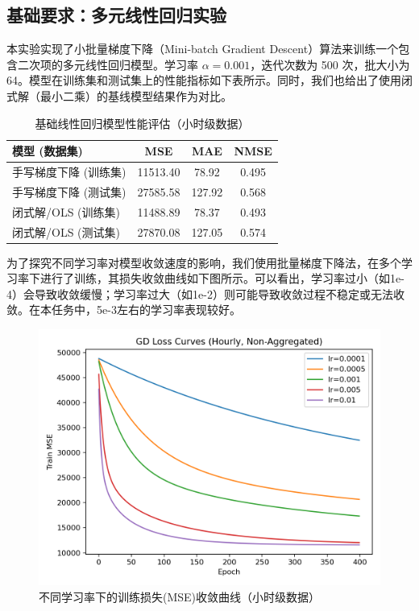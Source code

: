 \documentclass[UTF8,a4paper,10pt]{ctexart}
\begin{document}
\subsection{基础要求：多元线性回归实验}
本实验实现了小批量梯度下降（Mini-batch Gradient Descent）算法来训练一个包含二次项的多元线性回归模型。学习率 $\alpha=0.001$，迭代次数为 500 次，批大小为 64。模型在训练集和测试集上的性能指标如下表所示。同时，我们也给出了使用闭式解（最小二乘）的基线模型结果作为对比。

\begin{table}[H]
    \centering
    \caption{基础线性回归模型性能评估（小时级数据）}
    \begin{tabular}{lccc}
        \toprule
        \textbf{模型 (数据集)} & \textbf{MSE} & \textbf{MAE} & \textbf{NMSE} \\
        \midrule
        手写梯度下降 (训练集) & 11513.40 & 78.92 & 0.495 \\
        手写梯度下降 (测试集) & 27585.58 & 127.92 & 0.568 \\
        \midrule
        闭式解/OLS (训练集) & 11488.89 & 78.37 & 0.493 \\
        闭式解/OLS (测试集) & 27870.08 & 127.05 & 0.574 \\
        \bottomrule
    \end{tabular}
\end{table}

为了探究不同学习率对模型收敛速度的影响，我们使用批量梯度下降法，在多个学习率下进行了训练，其损失收敛曲线如下图所示。可以看出，学习率过小（如1e-4）会导致收敛缓慢；学习率过大（如1e-2）则可能导致收敛过程不稳定或无法收敛。在本任务中，5e-3左右的学习率表现较好。
\begin{figure}[H]
    \centering
    \includegraphics[width=0.7\linewidth]{pic/gd_loss_curves_nonagg.png}
    \caption{不同学习率下的训练损失(MSE)收敛曲线（小时级数据）}
    \label{fig:loss_curve_nonagg}
\end{figure}
\end{document}
